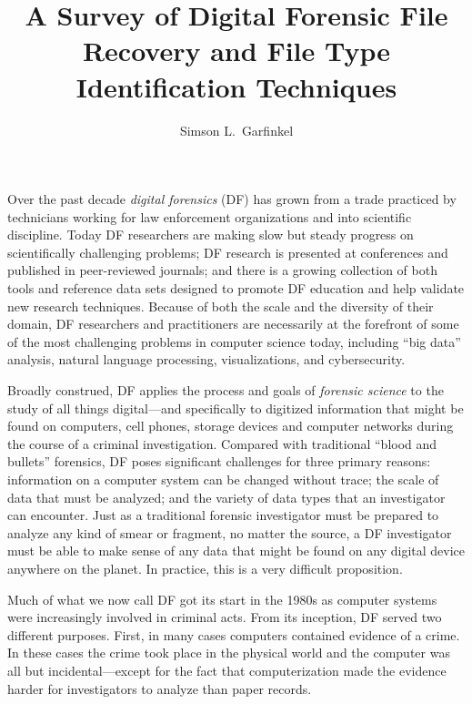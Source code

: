 \documentclass[11pt,letter]{article}
\begin{document}
\title{A Survey of Digital Forensic File Recovery and File Type Identification Techniques}
\author{Simson L.\ Garfinkel}
\maketitle
{}

Over the past decade \emph{digital forensics} (DF) has grown from a trade
practiced by technicians working for law enforcement
organizations and into scientific discipline. Today DF  researchers are
making slow but steady progress on scientifically challenging
problems; DF research is presented at conferences
and published in peer-reviewed journals; and there is a growing
collection of both tools and reference data sets designed to promote
DF education and help validate new research techniques. Because of
both the scale and the diversity of their domain, DF researchers and
practitioners are necessarily at the forefront of some of the most
challenging problems in computer science today, including ``big data''
analysis, natural language processing, visualizations, and
cybersecurity. 

Broadly construed, DF applies the process and goals of \emph{forensic
  science} to the study of all things digital---and specifically to
digitized information that might be found on computers, cell phones,
storage devices and  computer networks during the course of a
criminal investigation. Compared with traditional ``blood and
bullets'' forensics, DF poses significant challenges for three primary
reasons: information on a computer system can be changed without 
trace; the scale of data that must be analyzed; and the variety of
data types that an investigator can encounter. Just as a traditional forensic investigator must be
prepared to analyze any kind of smear or fragment, no matter the
source, a DF investigator must be able to make sense of any data that
might be found on any digital device anywhere on the planet. In
practice, this is a very difficult proposition.

Much of what we now call DF got its start in the 1980s
as computer systems were increasingly involved in criminal acts.
From its inception, DF served two different
purposes. First, in many cases computers contained evidence of a
crime. In these cases the crime took place in the physical world
and the computer was all but incidental---except for the fact that
computerization made the evidence harder for
investigators to analyze than paper records. 
\end{document}
